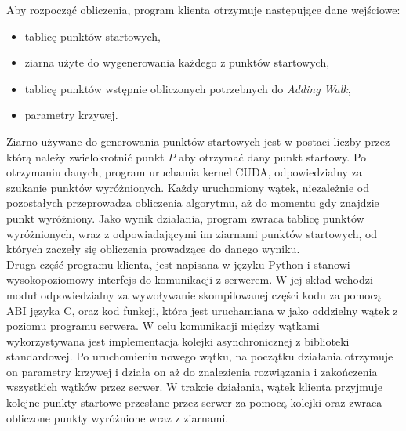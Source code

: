 Aby rozpocząć obliczenia, program klienta otrzymuje następujące dane wejściowe:
\begin{itemize}
    \item tablicę punktów startowych,
    \item ziarna użyte do wygenerowania każdego z punktów startowych,
    \item tablicę punktów wstępnie obliczonych potrzebnych do \textit{Adding Walk},
    \item parametry krzywej.  
\end{itemize}
Ziarno używane do generowania punktów startowych jest w postaci liczby przez
którą należy zwielokrotnić punkt $P$ aby otrzymać dany punkt startowy.
Po otrzymaniu danych, program uruchamia kernel CUDA, odpowiedzialny za szukanie punktów wyróżnionych.
Każdy uruchomiony wątek, niezależnie od pozostałych przeprowadza obliczenia algorytmu, aż do momentu
gdy znajdzie punkt wyróżniony.
Jako wynik działania, program zwraca
tablicę punktów wyróżnionych, wraz z odpowiadającymi im ziarnami punktów startowych, od których zaczeły
się obliczenia prowadzące do danego wyniku. \\
Druga część programu klienta, jest napisana w języku Python i stanowi wysokopoziomowy interfejs do komunikacji
z serwerem. W jej skład wchodzi moduł odpowiedzialny za wywoływanie skompilowanej części kodu za pomocą ABI języka C,
oraz kod funkcji, która jest uruchamiana w jako oddzielny wątek z poziomu programu serwera. W celu komunikacji
między wątkami wykorzystywana jest implementacja kolejki asynchronicznej z biblioteki standardowej.
Po uruchomieniu nowego wątku, na początku działania otrzymuje on parametry krzywej i działa
on aż do znalezienia rozwiązania i zakończenia wszystkich wątków przez serwer.
W trakcie działania, wątek klienta przyjmuje kolejne punkty startowe przesłane przez serwer za pomocą kolejki
oraz zwraca obliczone punkty wyróżnione wraz z ziarnami.

